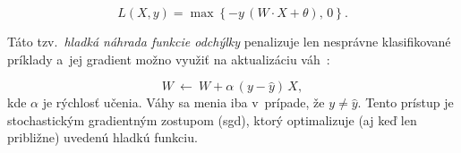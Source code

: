     \begin{equation}
      L(X, y) = \max\left\{ -y\,(W \cdot X + \theta),\, 0 \right\}.
    \end{equation}

    Táto tzv.\ \emph{hladká náhrada funkcie odchýlky} penalizuje len nesprávne klasifikované príklady a~jej gradient možno využiť na aktualizáciu váh~\cite{aggarwalNeuralNetworksDeep2018}:

    \begin{equation}
      W \:\leftarrow\: W + \alpha\, (y - \hat{y})\, X,
    \end{equation}
    kde $\alpha$ je rýchlosť učenia. Váhy sa menia iba v~prípade, že $y \ne \hat{y}$. Tento prístup je stochastickým gradientným zostupom (\acrshort{sgd}), ktorý optimalizuje (aj keď len približne) uvedenú hladkú funkciu.


    


